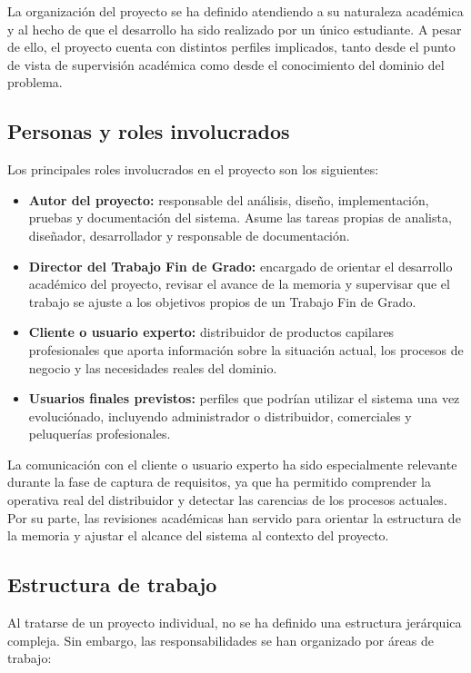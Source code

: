 La organización del proyecto se ha definido atendiendo a su naturaleza académica y al hecho de que el desarrollo ha sido realizado por un único estudiante. A pesar de ello, el proyecto cuenta con distintos perfiles implicados, tanto desde el punto de vista de supervisión académica como desde el conocimiento del dominio del problema.

\subsection{Personas y roles involucrados}

Los principales roles involucrados en el proyecto son los siguientes:

\begin{itemize}
    \item \textbf{Autor del proyecto:} responsable del análisis, diseño, implementación, pruebas y documentación del sistema. Asume las tareas propias de analista, diseñador, desarrollador y responsable de documentación.
    \item \textbf{Director del Trabajo Fin de Grado:} encargado de orientar el desarrollo académico del proyecto, revisar el avance de la memoria y supervisar que el trabajo se ajuste a los objetivos propios de un Trabajo Fin de Grado.
    \item \textbf{Cliente o usuario experto:} distribuidor de productos capilares profesionales que aporta información sobre la situación actual, los procesos de negocio y las necesidades reales del dominio.
    \item \textbf{Usuarios finales previstos:} perfiles que podrían utilizar el sistema una vez evoluciónado, incluyendo administrador o distribuidor, comerciales y peluquerías profesionales.
\end{itemize}

La comunicación con el cliente o usuario experto ha sido especialmente relevante durante la fase de captura de requisitos, ya que ha permitido comprender la operativa real del distribuidor y detectar las carencias de los procesos actuales. Por su parte, las revisiones académicas han servido para orientar la estructura de la memoria y ajustar el alcance del sistema al contexto del proyecto.

\subsection{Estructura de trabajo}

Al tratarse de un proyecto individual, no se ha definido una estructura jerárquica compleja. Sin embargo, las responsabilidades se han organizado por áreas de trabajo:


